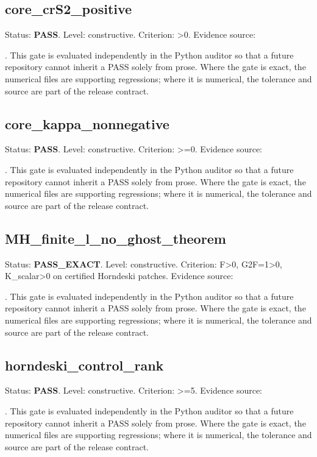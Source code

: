 \documentclass[11pt,a4paper,oneside]{book}
\begin{document}
\subsection{core\_crS2\_positive}
Status: \textbf{PASS}. Level: constructive. Criterion: >0. Evidence source:\par\noindent{}. This gate is evaluated independently in the Python auditor so that a future repository cannot inherit a PASS solely from prose. Where the gate is exact, the numerical files are supporting regressions; where it is numerical, the tolerance and source are part of the release contract.\par

\subsection{core\_kappa\_nonnegative}
Status: \textbf{PASS}. Level: constructive. Criterion: >=0. Evidence source:\par\noindent{}. This gate is evaluated independently in the Python auditor so that a future repository cannot inherit a PASS solely from prose. Where the gate is exact, the numerical files are supporting regressions; where it is numerical, the tolerance and source are part of the release contract.\par

\subsection{MH\_finite\_l\_no\_ghost\_theorem}
Status: \textbf{PASS\_EXACT}. Level: constructive. Criterion: F>0, G2F=1>0, K\_scalar>0 on certified Horndeski patches. Evidence source:\par\noindent{}. This gate is evaluated independently in the Python auditor so that a future repository cannot inherit a PASS solely from prose. Where the gate is exact, the numerical files are supporting regressions; where it is numerical, the tolerance and source are part of the release contract.\par

\subsection{horndeski\_control\_rank}
Status: \textbf{PASS}. Level: constructive. Criterion: >=5. Evidence source:\par\noindent{}. This gate is evaluated independently in the Python auditor so that a future repository cannot inherit a PASS solely from prose. Where the gate is exact, the numerical files are supporting regressions; where it is numerical, the tolerance and source are part of the release contract.\par
\end{document}
